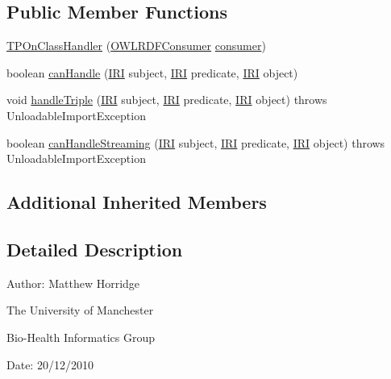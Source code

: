 \subsection*{Public Member Functions}
\begin{DoxyCompactItemize}
\item 
\hyperlink{classorg_1_1coode_1_1owlapi_1_1rdfxml_1_1parser_1_1_t_p_on_class_handler_aed909d7868bbe2433525139c95d20a27}{T\-P\-On\-Class\-Handler} (\hyperlink{classorg_1_1coode_1_1owlapi_1_1rdfxml_1_1parser_1_1_o_w_l_r_d_f_consumer}{O\-W\-L\-R\-D\-F\-Consumer} \hyperlink{classorg_1_1coode_1_1owlapi_1_1rdfxml_1_1parser_1_1_abstract_triple_handler_a4ccf4d898ff01eb1cadfa04b23d54e9c}{consumer})
\item 
boolean \hyperlink{classorg_1_1coode_1_1owlapi_1_1rdfxml_1_1parser_1_1_t_p_on_class_handler_a7e021f70d7178404e48ae0aa3960c987}{can\-Handle} (\hyperlink{classorg_1_1semanticweb_1_1owlapi_1_1model_1_1_i_r_i}{I\-R\-I} subject, \hyperlink{classorg_1_1semanticweb_1_1owlapi_1_1model_1_1_i_r_i}{I\-R\-I} predicate, \hyperlink{classorg_1_1semanticweb_1_1owlapi_1_1model_1_1_i_r_i}{I\-R\-I} object)
\item 
void \hyperlink{classorg_1_1coode_1_1owlapi_1_1rdfxml_1_1parser_1_1_t_p_on_class_handler_a0a98a9229e57545026ff4066abb11dc2}{handle\-Triple} (\hyperlink{classorg_1_1semanticweb_1_1owlapi_1_1model_1_1_i_r_i}{I\-R\-I} subject, \hyperlink{classorg_1_1semanticweb_1_1owlapi_1_1model_1_1_i_r_i}{I\-R\-I} predicate, \hyperlink{classorg_1_1semanticweb_1_1owlapi_1_1model_1_1_i_r_i}{I\-R\-I} object)  throws Unloadable\-Import\-Exception 
\item 
boolean \hyperlink{classorg_1_1coode_1_1owlapi_1_1rdfxml_1_1parser_1_1_t_p_on_class_handler_a93d785bc3140f28b60b81060fd900779}{can\-Handle\-Streaming} (\hyperlink{classorg_1_1semanticweb_1_1owlapi_1_1model_1_1_i_r_i}{I\-R\-I} subject, \hyperlink{classorg_1_1semanticweb_1_1owlapi_1_1model_1_1_i_r_i}{I\-R\-I} predicate, \hyperlink{classorg_1_1semanticweb_1_1owlapi_1_1model_1_1_i_r_i}{I\-R\-I} object)  throws Unloadable\-Import\-Exception 
\end{DoxyCompactItemize}
\subsection*{Additional Inherited Members}


\subsection{Detailed Description}
Author\-: Matthew Horridge\par
 The University of Manchester\par
 Bio-\/\-Health Informatics Group\par
 Date\-: 20/12/2010 

